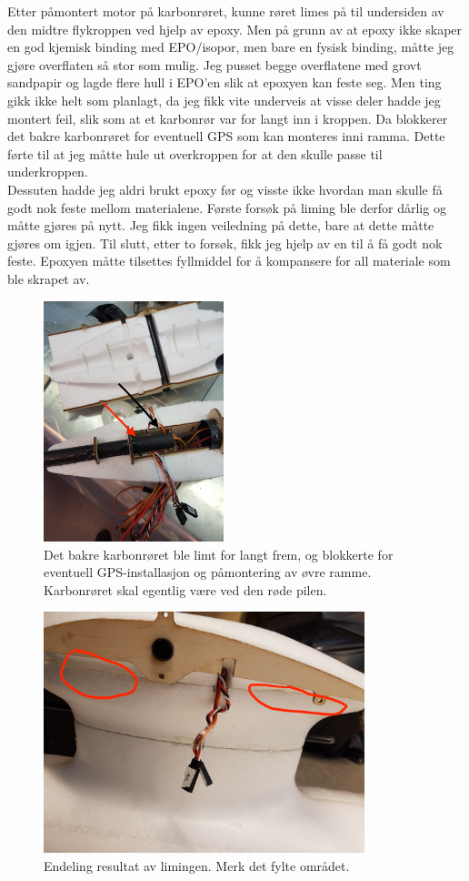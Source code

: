 \documentclass[12pt, a4paper]{report}
\begin{document}
\newpage
Etter påmontert motor på karbonrøret, kunne røret limes på til undersiden av den midtre flykroppen ved hjelp av epoxy. Men på grunn av at epoxy ikke skaper en god kjemisk binding med EPO/isopor, men bare en fysisk binding, måtte jeg gjøre overflaten så stor som mulig. Jeg pusset begge overflatene med grovt sandpapir og lagde flere hull i EPO'en slik at epoxyen kan feste seg. 
Men ting gikk ikke helt som planlagt, da jeg fikk vite underveis at visse deler hadde jeg montert feil, slik som at et karbonrør var for langt inn i kroppen. Da blokkerer det bakre karbonrøret for eventuell GPS som kan monteres inni ramma. Dette førte til at jeg måtte hule ut overkroppen for at den skulle passe til underkroppen. \\
Dessuten hadde jeg aldri brukt epoxy før og visste ikke hvordan man skulle få godt nok feste mellom materialene. Første forsøk på liming ble derfor dårlig og måtte gjøres på nytt. Jeg fikk ingen veiledning på dette, bare at dette måtte gjøres om igjen. Til slutt, etter to forsøk, fikk jeg hjelp av en til å få godt nok feste. Epoxyen måtte tilsettes fyllmiddel for å kompansere for all materiale som ble skrapet av. \\


\begin{figure}[ht]
	\centering
	\includegraphics[height = 7cm, width = .6\textwidth]{bilder/feilmontering_av_karbon_red.jpg}
	\caption{Det bakre karbonrøret ble limt for langt frem, og blokkerte for eventuell GPS-installasjon og påmontering av øvre ramme. Karbonrøret skal egentlig være ved den røde pilen.}
\end{figure}

\begin{figure}[ht]
 \centering
 \includegraphics[height=7cm, width = .6\textwidth]{bilder/fylling2_red.jpg}
 \caption{Endeling resultat av limingen. Merk det fylte området.}
\end{figure}
\newpage
\end{document}
